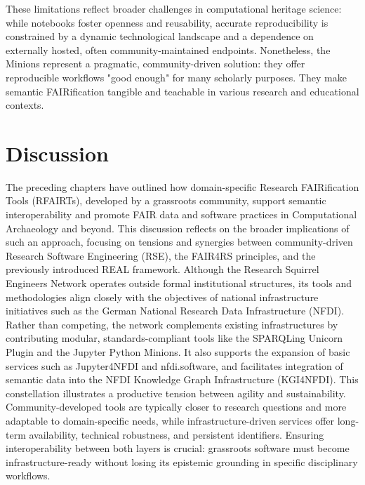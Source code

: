 \documentclass{eceasst}
\begin{document}
These limitations reflect broader challenges in computational heritage science: while notebooks foster openness and reusability, accurate reproducibility is constrained by a dynamic technological landscape and a dependence on externally hosted, often community-maintained endpoints. Nonetheless, the Minions represent a pragmatic, community-driven solution: they offer reproducible workflows "good enough" for many scholarly purposes. They make semantic FAIRification tangible and teachable in various research and educational contexts.

\section{Discussion}\label{sec:discussion}

The preceding chapters have outlined how domain-specific Research FAIRification Tools (RFAIRTs), developed by a grassroots community, support semantic interoperability and promote FAIR data and software practices in Computational Archaeology and beyond. This discussion reflects on the broader implications of such an approach, focusing on tensions and synergies between community-driven Research Software Engineering (RSE), the FAIR4RS principles, and the previously introduced REAL framework. Although the Research Squirrel Engineers Network operates outside formal institutional structures, its tools and methodologies align closely with the objectives of national infrastructure initiatives such as the German National Research Data Infrastructure (NFDI). Rather than competing, the network complements existing infrastructures by contributing modular, standards-compliant tools like the SPARQLing Unicorn Plugin and the Jupyter Python Minions. It also supports the expansion of basic services such as Jupyter4NFDI and nfdi.software, and facilitates integration of semantic data into the NFDI Knowledge Graph Infrastructure (KGI4NFDI). This constellation illustrates a productive tension between agility and sustainability. Community-developed tools are typically closer to research questions and more adaptable to domain-specific needs, while infrastructure-driven services offer long-term availability, technical robustness, and persistent identifiers. Ensuring interoperability between both layers is crucial: grassroots software must become infrastructure-ready without losing its epistemic grounding in specific disciplinary workflows.
\end{document}
